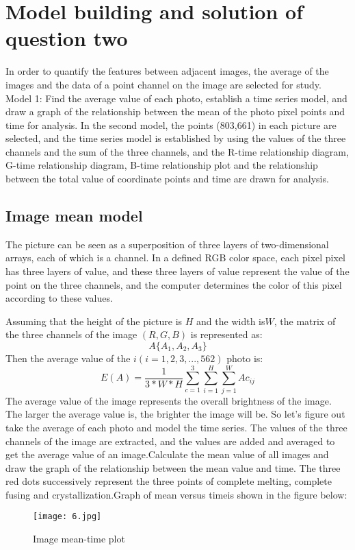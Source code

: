 \documentclass[12pt]{apmcmthesis}
\begin{document}
\section{Model building and solution of question two}
In order to quantify the features between adjacent images, the average of the images and the data of a point channel on the image are selected for study. Model 1: Find the average value of each photo, establish a time series model, and draw a graph of the relationship between the mean of the photo pixel points and time for analysis. In the second model, the points (803,661) in each picture are selected, and the time series model is established by using the values of the three channels and the sum of the three channels, and the R-time relationship diagram, G-time relationship diagram, B-time relationship plot and the relationship between the total value of coordinate points and time are drawn for analysis.

\subsection{Image mean model}
The picture can be seen as a superposition of three layers of two-dimensional arrays, each of which is a channel. In a defined RGB color space, each pixel pixel has three layers of value, and these three layers of value represent the value of the point on the three channels, and the computer determines the color of this pixel according to these values.

Assuming that the height of the picture is $ H $ and the width is$  W $, the matrix of the three channels of the image $ (R, G, B) $ is represented as:
$$A  \{A_1,A_2,A_3\} $$Then the average value of the $ i(i=1,2,3,...,562) $ photo is:
$$E(A) = \frac{1}{3 * W * H} \sum_{c=1}^{3} \sum_{i=1}^{H} \sum_{j=1}^{W} A c_{ij}$$
The average value of the image represents the overall brightness of the image. The larger the average value is, the brighter the image will be. So let's figure out take the average of each photo and model the time series. The values of the three channels of the image are extracted, and the values are added and averaged to get the average value of an image.Calculate the mean value of all images and draw the graph of the relationship between the mean value and time. The three red dots successively represent the three points of complete melting, complete fusing and crystallization.Graph of mean versus timeis shown in the figure below:
\begin{figure}[htbp]
	\centering
	\texttt{[image: 6.jpg]}	
	\caption{Image mean-time plot}
	\label{a}
\end{figure}
\end{document}
